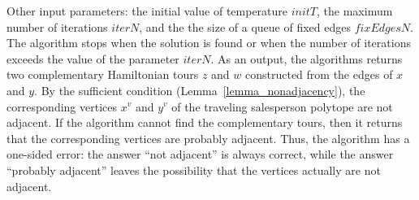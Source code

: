\documentclass[runningheads]{llncs}
\begin{document}
Other input parameters: the initial value of temperature $initT$, the maximum number of iterations $iterN$, and the the size of a queue of fixed edges $fixEdgesN$.
The algorithm stops when the solution is found or when the number of iterations exceeds the value of the parameter $iterN$.
As an output, the algorithms returns two complementary Hamiltonian tours $z$ and $w$ constructed from the edges of $x$ and $y$. By the sufficient condition (Lemma~\ref{lemma_nonadjacency}), the corresponding vertices $x^v$ and $y^v$ of the traveling salesperson polytope are not adjacent. %
If the algorithm cannot find the complementary tours, then it returns that the corresponding vertices are probably adjacent. Thus, the algorithm has a one-sided error: the answer ``not adjacent'' is always correct, while the answer ``probably adjacent'' leaves the possibility that the vertices actually are not adjacent. %
\end{document}
